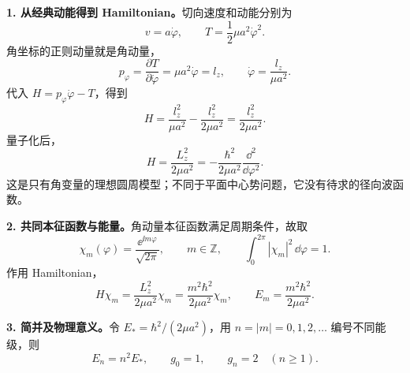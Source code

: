 \begin{checkedsolution}
\textbf{1. 从经典动能得到 Hamiltonian。}切向速度和动能分别为
\begin{equation}
  v=a\dot\varphi,\qquad T=\frac12\mu a^2\dot\varphi^2.
\end{equation}
角坐标的正则动量就是角动量，
\begin{equation}
  p_\varphi=\frac{\partial T}{\partial\dot\varphi}
       =\mu a^2\dot\varphi=l_z,\qquad
  \dot\varphi=\frac{l_z}{\mu a^2}.
\end{equation}
代入 $H=p_\varphi\dot\varphi-T$，得到
\begin{equation}
  H=\frac{l_z^2}{\mu a^2}-\frac{l_z^2}{2\mu a^2}
   =\frac{l_z^2}{2\mu a^2}.
\end{equation}
量子化后，
\begin{equation}
  \boxed{H=\frac{L_z^2}{2\mu a^2}
     =-\frac{\hbar^2}{2\mu a^2}\frac{\dd^2}{\dd\varphi^2}.}
\end{equation}
这是只有角变量的理想圆周模型；不同于平面中心势问题，它没有待求的径向波函数。

\textbf{2. 共同本征函数与能量。}角动量本征函数满足周期条件，故取
\begin{equation}
  \chi_m(\varphi)=\frac{\ee^{\ii m\varphi}}{\sqrt{2\pi}},
  \qquad m\in\mathbb Z,\qquad
  \int_0^{2\pi}|\chi_m|^2\,\dd\varphi=1.
\end{equation}
作用 Hamiltonian，
\begin{equation}
  H\chi_m=\frac{L_z^2}{2\mu a^2}\chi_m
          =\frac{m^2\hbar^2}{2\mu a^2}\chi_m,
  \qquad
  \boxed{E_m=\frac{m^2\hbar^2}{2\mu a^2}.}
\end{equation}

\textbf{3. 简并及物理意义。}令 $E_*=\hbar^2/(2\mu a^2)$，用 $n=|m|=0,1,2,\ldots$ 编号不同能级，则
\begin{equation}
  E_n=n^2E_*,\qquad
  \boxed{g_0=1,\qquad g_n=2\quad(n\geq1).}
\end{equation}
\begin{center}


\end{center}
\end{checkedsolution}
